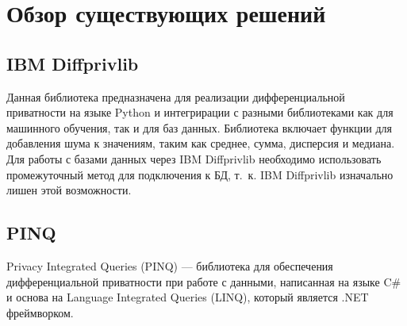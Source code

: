 \chapter{Обзор существующих решений}



\section{IBM Diffprivlib}
Данная библиотека предназначена для реализации дифференциальной приватности на языке Python и интегрирации с разными библиотеками как для машинного обучения, так и для баз данных.
Библиотека включает функции для добавления шума к значениям, таким как среднее, сумма, дисперсия и медиана.~\cite{diffprivlibibmdifferentialprivacy}
Для работы с базами данных через IBM Diffprivlib необходимо использовать промежуточный метод для подключения к БД, т.~к. IBM Diffprivlib изначально лишен этой возможности.

\section{PINQ}
Privacy Integrated Queries (PINQ) --- библиотека для обеспечения дифференциальной приватности при работе с данными, написанная на языке C\# и основа на Language Integrated Queries (LINQ), который является .NET фреймворком.~\cite{Lee2008}

